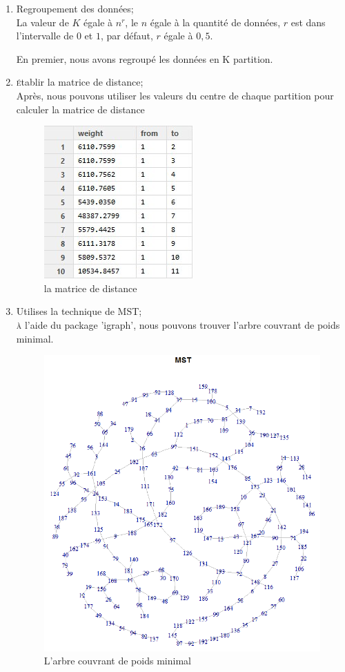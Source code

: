   \begin{enumerate}
  \item Regroupement des données;\\
  
   La valeur de $K$ égale à $n^r$, le $n$ égale à la quantité de données, $r$ est dans l'intervalle de $0$ et $1$, par défaut, $r$ égale à $0,5$.
   
   En premier, nous avons regroupé les données en K partition.
   
  \item \textsc{é}tablir la matrice de distance;\\
  
  Après, nous pouvons utiliser les valeurs du centre de chaque partition pour calculer la matrice de distance
  \begin{figure}[H]
\centering
\includegraphics[width=0.4\linewidth]{images/distance}
\caption{la matrice de distance}
\label{fig:distance}
\end{figure}

  
  \item Utilises la technique de MST;\\
  
  \textsc{à} l'aide du package 'igraph', nous pouvons trouver l'arbre couvrant de poids minimal.
  
  \begin{figure}[H]
\centering
\includegraphics[width=0.45\linewidth]{images/mst2}
\caption{L'arbre couvrant de poids minimal}
\label{fig:mst2}
\end{figure}


\end{enumerate}
